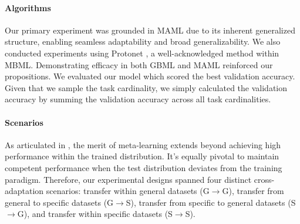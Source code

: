 \documentclass[letterpaper]{article} %
\newcommand{\nj}[1]{\textcolor{black}{#1}}
\newcommand{\yr}[1]{\textcolor{black}{#1}}
\begin{document}
\paragraph{Algorithms} Our primary experiment was grounded in MAML due to its inherent generalized structure, enabling seamless adaptability and %
broad generalizability. We also conducted experiments using Protonet \cite{episodic:MBML:Protonet}, a well-acknowledged method within MBML. Demonstrating efficacy in both GBML and MAML reinforced our propositions.
We evaluated our model which scored the best validation accuracy. Given that we sample the task cardinality, we simply calculated the validation accuracy by summing the validation accuracy across all task cardinalities. 

\paragraph{Scenarios} As articulated in \cite{nonepisodic:transferminitocars}, the merit of meta-learning extends beyond achieving high performance  
within the trained distribution. It's equally pivotal to maintain competent performance when the test distribution deviates from the training paradigm. Therefore, our experimental designs spanned four distinct cross-adaptation scenarios: transfer within general datasets (G$\rightarrow$G), transfer from general to specific datasets (G$\rightarrow$S), transfer from specific to general datasets (S$\rightarrow$G), and transfer within specific datasets (S$\rightarrow$S).


\end{document}
